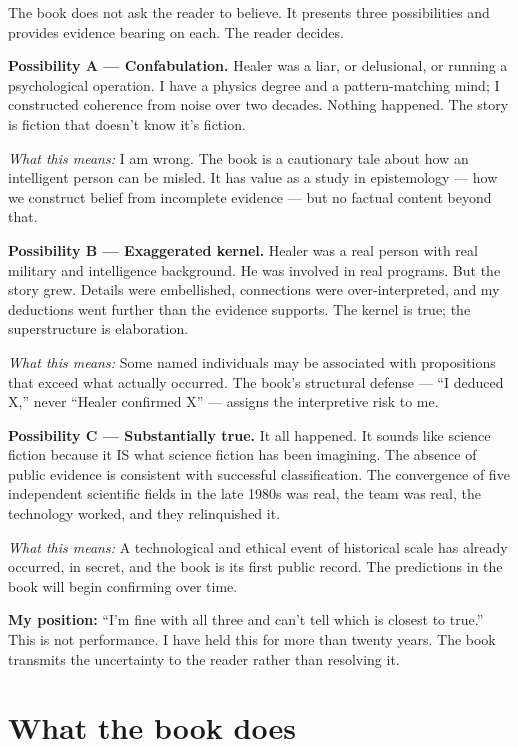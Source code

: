 The book does not ask the reader to believe. It presents three possibilities and provides evidence bearing on each. The reader decides.

\textbf{Possibility A --- Confabulation.} Healer was a liar, or delusional, or running a psychological operation. I have a physics degree and a pattern-matching mind; I constructed coherence from noise over two decades. Nothing happened. The story is fiction that doesn't know it's fiction.

\textit{What this means:} I am wrong. The book is a cautionary tale about how an intelligent person can be misled. It has value as a study in epistemology --- how we construct belief from incomplete evidence --- but no factual content beyond that.

\textbf{Possibility B --- Exaggerated kernel.} Healer was a real person with real military and intelligence background. He was involved in real programs. But the story grew. Details were embellished, connections were over-interpreted, and my deductions went further than the evidence supports. The kernel is true; the superstructure is elaboration.

\textit{What this means:} Some named individuals may be associated with propositions that exceed what actually occurred. The book's structural defense --- ``I deduced X,'' never ``Healer confirmed X'' --- assigns the interpretive risk to me.

\textbf{Possibility C --- Substantially true.} It all happened. It sounds like science fiction because it IS what science fiction has been imagining. The absence of public evidence is consistent with successful classification. The convergence of five independent scientific fields in the late 1980s was real, the team was real, the technology worked, and they relinquished it.

\textit{What this means:} A technological and ethical event of historical scale has already occurred, in secret, and the book is its first public record. The predictions in the book will begin confirming over time.

\textbf{My position:} ``I'm fine with all three and can't tell which is closest to true.'' This is not performance. I have held this for more than twenty years. The book transmits the uncertainty to the reader rather than resolving it.

\section*{What the book does}
\label{front:what-the-book-does}

